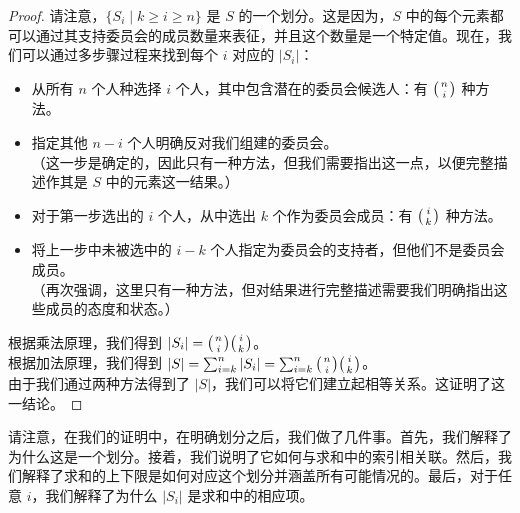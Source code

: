 \begin{example}[支持/反对委员会恒等式]
\begin{proof}
        请注意，$\{S_i \mid k \ge i \ge n\}$ 是 $S$ 的一个划分。这是因为，$S$ 中的每个元素都可以通过其支持委员会的成员数量来表征，并且这个数量是一个特定值。现在，我们可以通过多步骤过程来找到每个 $i$ 对应的 $|S_i|$：
        \begin{itemize}
            \item 从所有 $n$ 个人种选择 $i$ 个人，其中包含潜在的委员会候选人：有 $\big({n \atop i}\big)$ 种方法。
            \item 指定其他 $n - i$ 个人明确反对我们组建的委员会。\\
                  （这一步是确定的，因此只有一种方法，但我们需要指出这一点，以便完整描述作其是 $S$ 中的元素这一结果。）
            \item 对于第一步选出的 $i$ 个人，从中选出 $k$ 个作为委员会成员：有 $\big({i \atop k}\big)$ 种方法。
            \item 将上一步中未被选中的 $i - k$ 个人指定为委员会的支持者，但他们不是委员会成员。\\
                  （再次强调，这里只有一种方法，但对结果进行完整描述需要我们明确指出这些成员的态度和状态。）
        \end{itemize}
        根据乘法原理，我们得到 $|S_i| = \big({n \atop i}\big)\big({i \atop k}\big)$。\\
        根据加法原理，我们得到 $|S| = \sum_{i=k}^{n} |S_i| = \sum_{i=k}^{n}\big({n \atop i}\big)\big({i \atop k}\big)$。\\
        由于我们通过两种方法得到了 $|S|$，我们可以将它们建立起相等关系。这证明了这一结论。
    \end{proof}
\end{example}

请注意，在我们的证明中，在明确划分之后，我们做了几件事。首先，我们解释了为什么这是一个划分。接着，我们说明了它如何与求和中的索引相关联。然后，我们解释了求和的上下限是如何对应这个划分并涵盖所有可能情况的。最后，对于任意 $i$，我们解释了为什么 $|S_i|$ 是求和中的相应项。